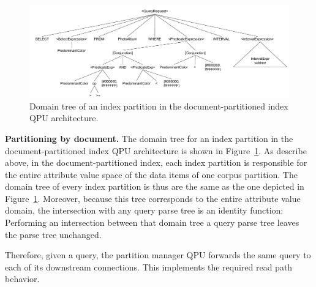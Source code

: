 \begin{figure}
  \centering
    \includegraphics[width=\textwidth]{./figures/case_studies/qpt_index_partitioning_docs.pdf}
  \caption{Domain tree of an index partition in the document-partitioned index QPU architecture.}
  \label{fig:qpt_index_partitioning_docs}
\end{figure}

\medskip
\noindent
\textbf{Partitioning by document.}
The domain tree for an index partition in the document-partitioned index QPU architecture is shown in Figure~\ref{fig:qpt_index_partitioning_docs}.
As describe above, in the document-partitioned index, each index partition is responsible for the entire attribute value space of
the data items of one corpus partition.
The domain tree of every index partition is thus are the same as the one depicted in Figure~\ref{fig:qpt_index_partitioning_docs}.
Moreover, because this tree corresponds to the entire attribute value domain,
the intersection with any query parse tree is an identity function:
Performing an intersection between that domain tree a query parse tree leaves the parse tree unchanged.

Therefore,
given a query,
the partition manager QPU forwards the same query to each of its downstream connections.
This implements the required read path behavior.



